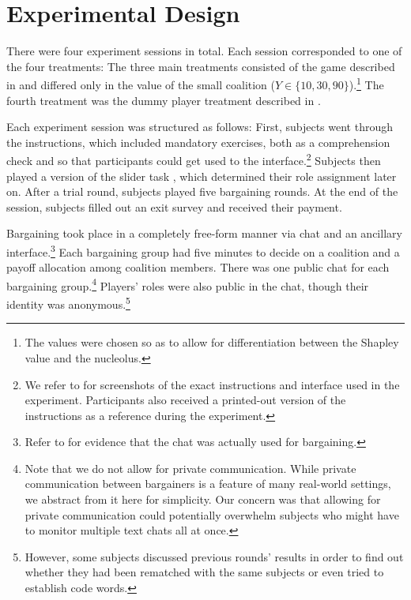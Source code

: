 \documentclass[12pt]{article}
\begin{document}
\section{Experimental Design} \label{sec:exp_design}


There were four experiment sessions in total. Each session corresponded to one of the four treatments: The three main treatments consisted of the game described in  and differed only in the value of the small coalition ($Y \in \{10,30,90\}$).\footnote{The values were chosen so as to allow for differentiation between the Shapley value and the nucleolus.} The fourth treatment was the dummy player treatment described in . 

Each experiment session was structured as follows: First, subjects went through the instructions, which included mandatory exercises, both as a comprehension check and so that participants could get used to the interface.\footnote{We refer to  for screenshots of the exact instructions and interface used in the experiment. Participants also received a printed-out version of the instructions as a reference during the experiment.} Subjects then played a version of the slider task \parencite{GillProwse2012slider}, which determined their role assignment later on. After a trial round, subjects played five bargaining rounds. At the end of the session, subjects filled out an exit survey and received their payment. 

Bargaining took place in a completely free-form manner via chat and an ancillary interface.\footnote{Refer to  for evidence that the chat was actually used for bargaining.} Each bargaining group had five minutes to decide on a coalition and a payoff allocation among coalition members. There was one public chat for each bargaining group.\footnote{Note that we do not allow for private communication. While private communication between bargainers is a feature of many real-world settings, we abstract from it here for simplicity. Our concern was that allowing for private communication could potentially overwhelm subjects who might have to monitor multiple text chats all at once.} Players' roles were also public in the chat, though their identity was anonymous.\footnote{However, some subjects discussed previous rounds' results in order to find out whether they had been rematched with the same subjects or even tried to establish code words.} 
\end{document}
